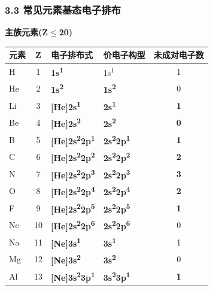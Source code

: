 \documentclass[a4paper,11pt]{ctexart}
\newcounter{none}
\newcommand{\箭}{\ensuremath{\rightarrow}}
\newcommand{\左箭}{\ensuremath{\leftarrow}}
\newcommand{\上箭}{\ensuremath{\uparrow}}
\newcommand{\下箭}{\ensuremath{\downarrow}}
\newcommand{\衡}{\ensuremath{\rightleftharpoons}}
\newcommand{\双箭}{\ensuremath{\leftrightarrow}}
\newcommand{\约等于}{\ensuremath{\approx}}
\newcommand{\小于等于}{\ensuremath{\leq}}
\newcommand{\大于等于}{\ensuremath{\geq}}
\newcommand{\不等于}{\ensuremath{\neq}}
\newcommand{\西格马}{\ensuremath{\sigma}}
\newcommand{\派}{\ensuremath{\pi}}
\begin{document}
\subsubsection{3.3 常见元素基态电子排布}\label{ux5e38ux89c1ux5143ux7d20ux57faux6001ux7535ux5b50ux6392ux5e03}

\textbf{主族元素(Z\小于等于20)}

{\def\LTcaptype{none} %
\begin{longtable}[]{@{}lcllc@{}}
\toprule\noalign{}
元素 & Z & 电子排布式 & 价电子构型 & 未成对电子数 \\
\midrule\noalign{}
\endhead
\bottomrule\noalign{}
\endlastfoot
H & 1 & \textbf{1s\textsuperscript{1}} & 1s\textsuperscript{1} & 1 \\
He & 2 & \textbf{1s\textsuperscript{2}} & \textbf{1s\textsuperscript{2}} & 0 \\
Li & 3 & \textbf{{[}He{]}2s\textsuperscript{1}} & \textbf{2s\textsuperscript{1}} & \textbf{1} \\
Be & 4 & \textbf{{[}He{]}2s\textsuperscript{2}} & \textbf{2s\textsuperscript{2}} & \textbf{0} \\
B & 5 & \textbf{{[}He{]}2s\textsuperscript{2}2p\textsuperscript{1}} & \textbf{2s\textsuperscript{2}2p\textsuperscript{1}} & \textbf{1} \\
C & 6 & \textbf{{[}He{]}2s\textsuperscript{2}2p\textsuperscript{2}} & \textbf{2s\textsuperscript{2}2p\textsuperscript{2}} & \textbf{2} \\
N & 7 & \textbf{{[}He{]}2s\textsuperscript{2}2p\textsuperscript{3}} & \textbf{2s\textsuperscript{2}2p\textsuperscript{3}} & \textbf{3} \\
O & 8 & \textbf{{[}He{]}2s\textsuperscript{2}2p\textsuperscript{4}} & \textbf{2s\textsuperscript{2}2p\textsuperscript{4}} & \textbf{2} \\
F & 9 & \textbf{{[}He{]}2s\textsuperscript{2}2p\textsuperscript{5}} & \textbf{2s\textsuperscript{2}2p\textsuperscript{5}} & \textbf{1} \\
Ne & 10 & \textbf{{[}He{]}2s\textsuperscript{2}2p\textsuperscript{6}} & \textbf{2s\textsuperscript{2}2p\textsuperscript{6}} & 0 \\
Na & 11 & \textbf{{[}Ne{]}3s\textsuperscript{1}} & \textbf{3s\textsuperscript{1}} & 1 \\
Mg & 12 & \textbf{{[}Ne{]}3s\textsuperscript{2}} & \textbf{3s\textsuperscript{2}} & 0 \\
Al & 13 & \textbf{{[}Ne{]}3s\textsuperscript{2}3p\textsuperscript{1}} & \textbf{3s\textsuperscript{2}3p\textsuperscript{1}} & \textbf{1} \\

\end{longtable}}
\end{document}
